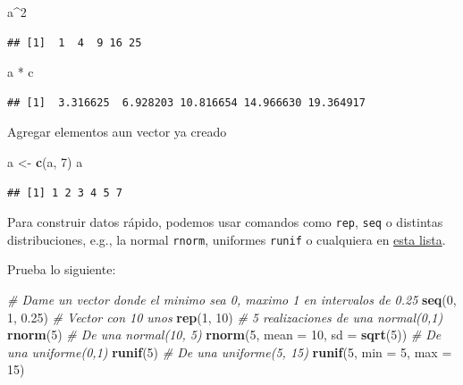 \documentclass[]{article}
\newenvironment{Shaded}{\begin{snugshade}}{\end{snugshade}}
\newcommand{\KeywordTok}[1]{\textcolor[rgb]{0.13,0.29,0.53}{\textbf{{#1}}}}
\newcommand{\DataTypeTok}[1]{\textcolor[rgb]{0.13,0.29,0.53}{{#1}}}
\newcommand{\DecValTok}[1]{\textcolor[rgb]{0.00,0.00,0.81}{{#1}}}
\newcommand{\FloatTok}[1]{\textcolor[rgb]{0.00,0.00,0.81}{{#1}}}
\newcommand{\StringTok}[1]{\textcolor[rgb]{0.31,0.60,0.02}{{#1}}}
\newcommand{\CommentTok}[1]{\textcolor[rgb]{0.56,0.35,0.01}{\textit{{#1}}}}
\newcommand{\NormalTok}[1]{{#1}}
\begin{document}
\begin{Shaded}
\begin{Highlighting}[]
\NormalTok{a^}\DecValTok{2}
\end{Highlighting}
\end{Shaded}

\begin{verbatim}
## [1]  1  4  9 16 25
\end{verbatim}

\begin{Shaded}
\begin{Highlighting}[]
\NormalTok{a *}\StringTok{ }\NormalTok{c}
\end{Highlighting}
\end{Shaded}

\begin{verbatim}
## [1]  3.316625  6.928203 10.816654 14.966630 19.364917
\end{verbatim}

Agregar elementos aun vector ya creado

\begin{Shaded}
\begin{Highlighting}[]
\NormalTok{a <-}\StringTok{ }\KeywordTok{c}\NormalTok{(a, }\DecValTok{7}\NormalTok{)}
\NormalTok{a}
\end{Highlighting}
\end{Shaded}

\begin{verbatim}
## [1] 1 2 3 4 5 7
\end{verbatim}

Para construir datos rápido, podemos usar comandos como \texttt{rep},
\texttt{seq} o distintas distribuciones, e.g., la normal \texttt{rnorm},
uniformes \texttt{runif} o cualquiera en
\href{https://stat.ethz.ch/R-manual/R-devel/library/stats/html/Distributions.html}{esta
lista}.

Prueba lo siguiente:

\begin{Shaded}
\begin{Highlighting}[]
\CommentTok{# Dame un vector donde el minimo sea 0, maximo 1 en intervalos de 0.25}
\KeywordTok{seq}\NormalTok{(}\DecValTok{0}\NormalTok{, }\DecValTok{1}\NormalTok{, }\FloatTok{0.25}\NormalTok{)}
\CommentTok{# Vector con 10 unos}
\KeywordTok{rep}\NormalTok{(}\DecValTok{1}\NormalTok{, }\DecValTok{10}\NormalTok{)}
\CommentTok{# 5 realizaciones de una normal(0,1)}
\KeywordTok{rnorm}\NormalTok{(}\DecValTok{5}\NormalTok{)}
\CommentTok{# De una normal(10, 5)}
\KeywordTok{rnorm}\NormalTok{(}\DecValTok{5}\NormalTok{, }\DataTypeTok{mean =} \DecValTok{10}\NormalTok{, }\DataTypeTok{sd =} \KeywordTok{sqrt}\NormalTok{(}\DecValTok{5}\NormalTok{))}
\CommentTok{# De una uniforme(0,1)}
\KeywordTok{runif}\NormalTok{(}\DecValTok{5}\NormalTok{)}
\CommentTok{# De una uniforme(5, 15)}
\KeywordTok{runif}\NormalTok{(}\DecValTok{5}\NormalTok{, }\DataTypeTok{min =} \DecValTok{5}\NormalTok{, }\DataTypeTok{max =} \DecValTok{15}\NormalTok{)}
\end{Highlighting}
\end{Shaded}
\end{document}

